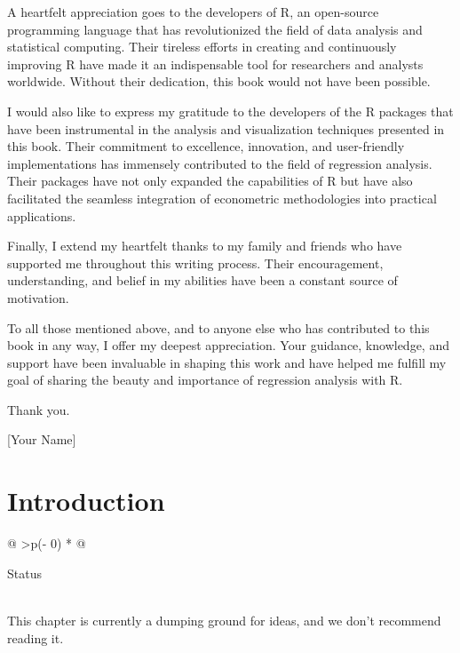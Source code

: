 \documentclass[
  letterpaper,
  paper =a4,
  twoside,
  openright,
  headsepline,
  footsepline,
  listof = totocnumbered,
  chapterprefix = true,
  firstiscover]{scrbook}
\begin{document}
A heartfelt appreciation goes to the developers of R, an open-source
programming language that has revolutionized the field of data analysis
and statistical computing. Their tireless efforts in creating and
continuously improving R have made it an indispensable tool for
researchers and analysts worldwide. Without their dedication, this book
would not have been possible.

I would also like to express my gratitude to the developers of the R
packages that have been instrumental in the analysis and visualization
techniques presented in this book. Their commitment to excellence,
innovation, and user-friendly implementations has immensely contributed
to the field of regression analysis. Their packages have not only
expanded the capabilities of R but have also facilitated the seamless
integration of econometric methodologies into practical applications.

Finally, I extend my heartfelt thanks to my family and friends who have
supported me throughout this writing process. Their encouragement,
understanding, and belief in my abilities have been a constant source of
motivation.

To all those mentioned above, and to anyone else who has contributed to
this book in any way, I offer my deepest appreciation. Your guidance,
knowledge, and support have been invaluable in shaping this work and
have helped me fulfill my goal of sharing the beauty and importance of
regression analysis with R.

Thank you.

{[}Your Name{]}


\hypertarget{introduction}{%
\chapter{Introduction}\label{introduction}}

\begin{longtable}[]{@{}
  >{\centering\arraybackslash}p{(\columnwidth - 0\tabcolsep) * }@{}}
\toprule\noalign{}
\begin{minipage}[b]{\linewidth}\centering
Status
\end{minipage} \\
\midrule\noalign{}
\endhead
\bottomrule\noalign{}
\endlastfoot
This chapter is currently a dumping ground for ideas, and we don't
recommend reading it. \\
\end{longtable}
\end{document}
